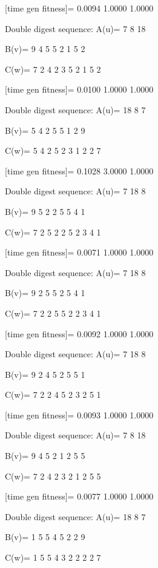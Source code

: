 [time gen fitness]=
    0.0094    1.0000    1.0000

Double digest sequence:
A(u)=
     7     8    18

B(v)=
     9     4     5     5     2     1     5     2

C(w)=
     7     2     4     2     3     5     2     1     5     2

[time gen fitness]=
    0.0100    1.0000    1.0000

Double digest sequence:
A(u)=
    18     8     7

B(v)=
     5     4     2     5     5     1     2     9

C(w)=
     5     4     2     5     2     3     1     2     2     7

[time gen fitness]=
    0.1028    3.0000    1.0000

Double digest sequence:
A(u)=
     7    18     8

B(v)=
     9     5     2     2     5     5     4     1

C(w)=
     7     2     5     2     2     5     2     3     4     1

[time gen fitness]=
    0.0071    1.0000    1.0000

Double digest sequence:
A(u)=
     7    18     8

B(v)=
     9     2     5     5     2     5     4     1

C(w)=
     7     2     2     5     5     2     2     3     4     1

[time gen fitness]=
    0.0092    1.0000    1.0000

Double digest sequence:
A(u)=
     7    18     8

B(v)=
     9     2     4     5     2     5     5     1

C(w)=
     7     2     2     4     5     2     3     2     5     1

[time gen fitness]=
    0.0093    1.0000    1.0000

Double digest sequence:
A(u)=
     7     8    18

B(v)=
     9     4     5     2     1     2     5     5

C(w)=
     7     2     4     2     3     2     1     2     5     5

[time gen fitness]=
    0.0077    1.0000    1.0000

Double digest sequence:
A(u)=
    18     8     7

B(v)=
     1     5     5     4     5     2     2     9

C(w)=
     1     5     5     4     3     2     2     2     2     7

